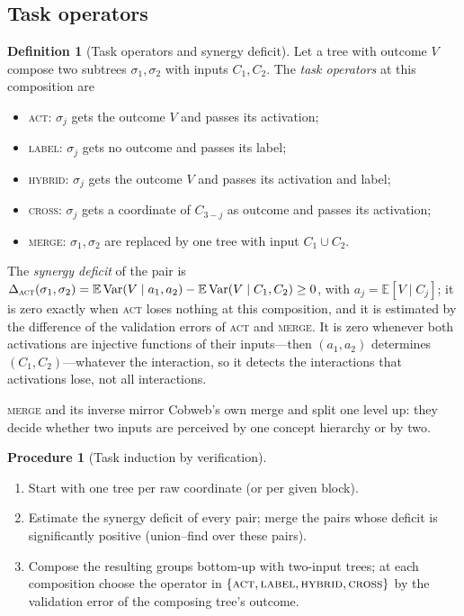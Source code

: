 \documentclass[11pt]{article}
\theoremstyle{definition}
\newtheorem{definition}[theorem]{Definition}
\newtheorem{procedure}[theorem]{Procedure}
\theoremstyle{remark}
\newcommand{\E}{\mathbb{E}}
\newcommand{\Var}{\operatorname{Var}}
\begin{document}
\subsection{Task operators}

\begin{definition}[Task operators and synergy deficit]\label{def:operators}
Let a tree with outcome $V$ compose two subtrees $\sigma_1,\sigma_2$ with inputs
$C_1,C_2$.  The \emph{task operators} at this composition are
\begin{itemize}[leftmargin=*,noitemsep]
\item \textsc{act}: $\sigma_j$ gets the outcome $V$ and passes its activation;
\item \textsc{label}: $\sigma_j$ gets no outcome and passes its label;
\item \textsc{hybrid}: $\sigma_j$ gets the outcome $V$ and passes its activation and label;
\item \textsc{cross}: $\sigma_j$ gets a coordinate of $C_{3-j}$ as outcome and passes its
  activation;
\item \textsc{merge}: $\sigma_1,\sigma_2$ are replaced by one tree with input $C_1\cup C_2$.
\end{itemize}
The \emph{synergy deficit} of the pair is
$\Delta_{\textsc{act}}(\sigma_1,\sigma_2)=\E\Var(V\mid a_1,a_2)-\E\Var(V\mid C_1,C_2)\ge0$,
with $a_j=\E[V\mid C_j]$; it is zero exactly when \textsc{act} loses nothing at this
composition, and it is estimated by the difference of the validation errors of
\textsc{act} and \textsc{merge}.  It is zero whenever both activations are injective
functions of their inputs---then $(a_1,a_2)$ determines $(C_1,C_2)$---whatever the
interaction, so it detects the interactions that activations lose, not all
interactions.
\end{definition}

\textsc{merge} and its inverse mirror Cobweb's own merge and split one level up: they
decide whether two inputs are perceived by one concept hierarchy or by two.

\begin{procedure}[Task induction by verification]\label{proc:induction}
\leavevmode
\begin{enumerate}[leftmargin=*,noitemsep]
\item Start with one tree per raw coordinate (or per given block).
\item Estimate the synergy deficit of every pair; merge the pairs whose deficit is
  significantly positive (union--find over these pairs).
\item Compose the resulting groups bottom-up with two-input trees; at each composition
  choose the operator in $\{\textsc{act},\textsc{label},\textsc{hybrid},\textsc{cross}\}$
  by the validation error of the composing tree's outcome.
\end{enumerate}
\end{procedure}
\end{document}
